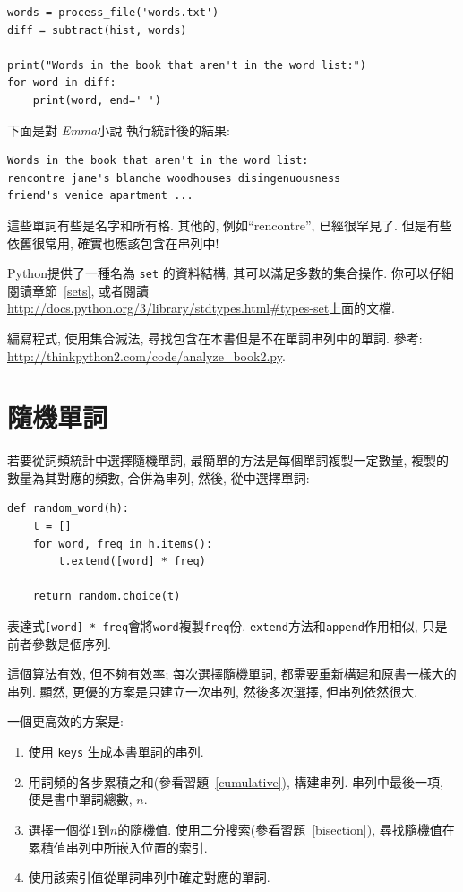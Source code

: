 \documentclass[10pt]{book}
\begin{document}
\begin{verbatim}
words = process_file('words.txt')
diff = subtract(hist, words)

print("Words in the book that aren't in the word list:")
for word in diff:
    print(word, end=' ')
\end{verbatim}
%
下面是對 {\em Emma}小說 執行統計後的結果:

\begin{verbatim}
Words in the book that aren't in the word list:
rencontre jane's blanche woodhouses disingenuousness 
friend's venice apartment ...
\end{verbatim}
%
這些單詞有些是名字和所有格. 其他的, 例如``rencontre'', 已經很罕見了. 
但是有些依舊很常用, 確實也應該包含在串列中!

\begin{exercise}

Python提供了一種名為 {\tt set} 的資料結構, 其可以滿足多數的集合操作. 
你可以仔細閱讀章節~\ref{sets}, 或者閱讀
\url{http://docs.python.org/3/library/stdtypes.html#types-set}上面的文檔. 

編寫程式, 使用集合減法, 尋找包含在本書但是不在單詞串列中的單詞. 
參考:
\url{http://thinkpython2.com/code/analyze_book2.py}.

\end{exercise}


\section{隨機單詞}
\label{randomwords}

若要從詞頻統計中選擇隨機單詞, 最簡單的方法是每個單詞複製一定數量, 
複製的數量為其對應的頻數, 合併為串列, 然後, 從中選擇單詞:

\begin{verbatim}
def random_word(h):
    t = []
    for word, freq in h.items():
        t.extend([word] * freq)

    return random.choice(t)
\end{verbatim}
%
表達式{\tt [word] * freq}會將{\tt word}複製{\tt freq}份. 
{\tt extend}方法和{\tt append}作用相似, 只是前者參數是個序列. 

這個算法有效, 但不夠有效率; 每次選擇隨機單詞, 
都需要重新構建和原書一樣大的串列. 
顯然, 更優的方案是只建立一次串列, 然後多次選擇, 但串列依然很大.

一個更高效的方案是:

\begin{enumerate}

\item 使用 {\tt keys} 生成本書單詞的串列.

\item 用詞頻的各步累積之和(參看習題~\ref{cumulative}), 構建串列. 
串列中最後一項, 便是書中單詞總數, $n$. 
  
\item 選擇一個從1到$n$的隨機值. 使用二分搜索(參看習題~\ref{bisection}), 
尋找隨機值在累積值串列中所嵌入位置的索引. 

\item 使用該索引值從單詞串列中確定對應的單詞. 

\end{enumerate}
\end{document}
